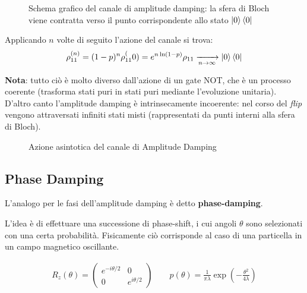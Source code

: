 \documentclass[../../InformazioneQuantistica.tex]{subfiles}
\begin{document}
\begin{figure}[H]
\centering

\caption{Schema grafico del canale di amplitude damping: la sfera di Bloch viene contratta verso il punto corrispondente allo stato $\Ket{0}\Bra{0}$ \label{fig:damping-schema}}
\end{figure}

Applicando $n$ volte di seguito l'azione del canale si trova:
\begin{align*}
\rho_{11}^{(n)} = (1-p)^n \rho_{11}^(0) = e^{n\ln(1-p)}\rho_{11} \xrightarrow[n\to\infty]{} \Ket{0}\Bra0
\end{align*}

\textbf{Nota}: tutto ciò è molto diverso dall'azione di un gate NOT, che è un processo coerente (trasforma stati puri in stati puri mediante l'evoluzione unitaria). D'altro canto l'amplitude damping è intrinsecamente incoerente: nel corso del \textit{flip} vengono attraversati infiniti stati misti (rappresentati da punti interni alla sfera di Bloch).


\begin{figure}
    \centering
    
    \caption{Azione asintotica del canale di Amplitude Damping}
    \label{fig:amplitude-damp-asintoto}
\end{figure}

\subsection{Phase Damping}
L'analogo per le fasi dell'amplitude damping è detto \textbf{phase-damping}.\\
\begin{comment}
\begin{figure}[H]
\centering
[Missing]
\caption{Rappresentazione geometrica dell'azione del canale phase damping\label{fig:phase-damping-geom}}
\end{figure}
\end{comment}
L'idea è di effettuare una successione di phase-shift, i cui angoli $\theta$ sono selezionati con una certa probabilità. Fisicamente ciò corrisponde al caso di una particella in un campo magnetico oscillante.

\begin{align*}
R_z(\theta) = \begin{pmatrix}e^{-i\theta/2} & 0\\ 0 & e^{i\theta/2}\end{pmatrix} \qquad p(\theta) = \frac{1}{\pi\lambda} \exp\left(-\frac{\theta^2}{4\lambda}\right)
\end{align*}
\end{document}

